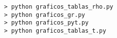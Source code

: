 \begin{verbatim}
  > python graficos_tablas_rho.py
  > python graficos_gr.py   
  > python graficos_pyt.py  
  > python graficos_tablas_t.py
\end{verbatim}




\begin{comment}
Si se quieren obtener los gráficos de las correlaciones a distintas temperaturas, 
se debe correr:

\begin{verbatim}
  > python correlaciones.py 
\end{verbatim}

\subsection{Corridas en serie}\label{serie}
El módulo python \texttt{corridas.py}, es el que tiene la capacidad de correr
el código de cálculo en una máquina con un único núcleo. Parametrizando 
adecuadamente \texttt{parametros.py} se logran tiempos de corrida razonables en 
una máquina con un único procesador. El parámetro que permite acelerar la 
velocidad de procesamiento, es el que indica cada cuantos pasos Monte Carlo se 
quieren grabar las energías.

\subsection{Corridas en paralelo}\label{paralelo}

El módulo python \texttt{corridas\_paralelos.py}, es el que tiene la capacidad 
de correr en una máquina con varios procesadores.

El código se paraleliza usando el paquete \href{http://mpi4py.scipy.org/} {\textbf{mpi4py}} ,  desarrollado por Lisandro Dalcin.
De esa manera lo que se hizo, es paralelizar desde python y no desde Fortran.

El criterio utilizado para paralelizar es hacer en simultaneo  las corridas a 
una dada temperatura. 
Una vez que terminan los cálculos a una dada temperatura, se hacen los cálculos 
en la próxima temperatura con el estado final de la temperatura anterior.

Este diseño permitió hacer cálculos en sistemas de mayor tamaño, lograndose llegar a dimensiones
de 100x100. De esa manera se obtuvieron las curvas que muestran el comportamiento del sistema en
tamaños mayores a 20x20.
\end{comment}
